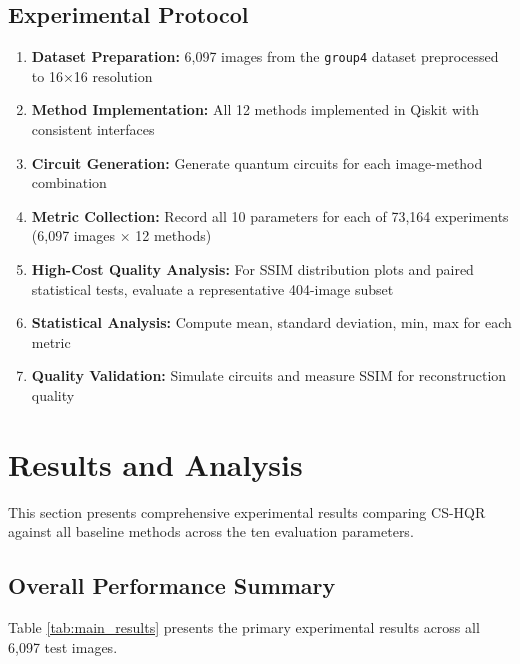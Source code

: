 \documentclass[11pt,a4paper]{article}
\begin{document}
\subsection{Experimental Protocol}

\begin{enumerate}
    \item \textbf{Dataset Preparation:} 6,097 images from the \texttt{group4} dataset preprocessed to 16×16 resolution
    \item \textbf{Method Implementation:} All 12 methods implemented in Qiskit with consistent interfaces
    \item \textbf{Circuit Generation:} Generate quantum circuits for each image-method combination
    \item \textbf{Metric Collection:} Record all 10 parameters for each of 73,164 experiments (6,097 images × 12 methods)
    \item \textbf{High-Cost Quality Analysis:} For SSIM distribution plots and paired statistical tests, evaluate a representative 404-image subset
    \item \textbf{Statistical Analysis:} Compute mean, standard deviation, min, max for each metric
    \item \textbf{Quality Validation:} Simulate circuits and measure SSIM for reconstruction quality
\end{enumerate}

\section{Results and Analysis}
\label{sec:results}

This section presents comprehensive experimental results comparing CS-HQR against all baseline methods across the ten evaluation parameters.

\subsection{Overall Performance Summary}
\label{subsec:performance_summary}

Table \ref{tab:main_results} presents the primary experimental results across all 6,097 test images.


\end{document}
